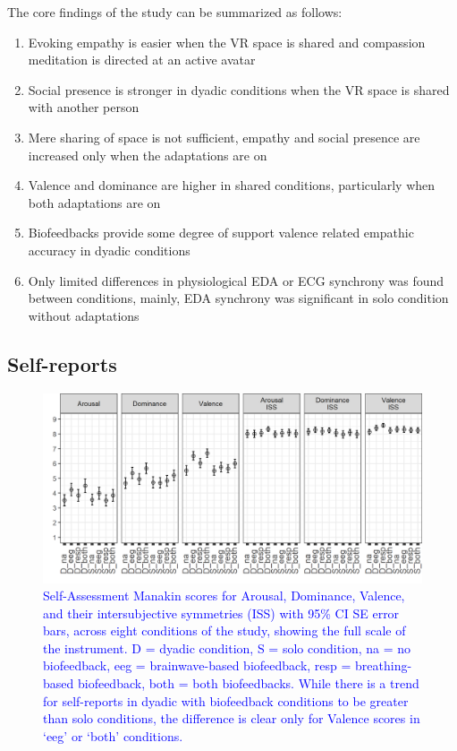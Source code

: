 \documentclass[manuscript, review = false, screen]{acmart}
\begin{document}
The core findings of the study can be summarized as follows:
\begin{enumerate}
\item Evoking empathy is easier when the VR space is shared and compassion meditation is directed at an active avatar
\item Social presence is stronger in dyadic conditions when the VR space is shared with another person
\item Mere sharing of space is not sufficient, empathy and social presence are increased only when the adaptations are on
\item Valence and dominance are higher in shared conditions, particularly when both adaptations are on
\item Biofeedbacks provide some degree of support valence related empathic accuracy in dyadic conditions
\item Only limited differences in physiological EDA or ECG synchrony was found between conditions, mainly, EDA synchrony was significant in solo condition without adaptations

\end{enumerate}

\subsection{Self-reports}

\begin{figure}
    \centering
    \includegraphics[width=\textwidth]{images/SAM.png}
    \caption{\textcolor{blue}{Self-Assessment Manakin scores for Arousal, Dominance, Valence, and their intersubjective symmetries (ISS) with 95\% CI SE error bars, across eight conditions of the study, showing the full scale of the instrument. D = dyadic condition, S = solo condition, na = no biofeedback, eeg = brainwave-based biofeedback, resp = breathing-based biofeedback, both = both biofeedbacks. While there is a trend for self-reports in dyadic with biofeedback conditions to be greater than solo conditions, the difference is clear only for Valence scores in `eeg' or `both' conditions.}}
    \label{fig:sam}
\end{figure}
\end{document}
